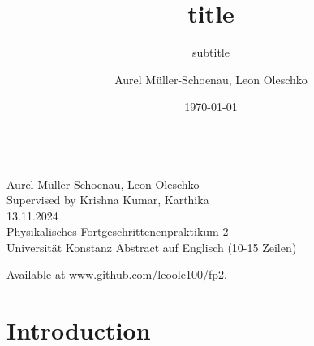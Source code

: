 \documentclass[
    parskip=half, 
    twoside=false,
    twocolumn=true,
    fontsize=11pt,
]{scrarticle}
\begin{document}
\title{title}
\subtitle{subtitle}
\author{Aurel Müller-Schoenau, Leon Oleschko}
\date{\dotdate\today}


\begin{titlepage}
    \sffamily
    \vspace*{3cm}
    {
        \fontsize{32}{32}
    }
    \vspace{.25cm}\\
    {
        \Large
        Aurel Müller-Schoenau, Leon Oleschko\\
        Supervised by Krishna Kumar, Karthika
        \vspace{.05cm}\\
        13.11.2024
        \vspace{.25cm}\\
        \normalsize
        Physikalisches Fortgeschrittenenpraktikum 2\\
        Universität Konstanz
    }
    \vfill
    {
        \normalfont\normalsize
        Abstract auf Englisch (10-15 Zeilen)
        \blindtext[2]
    }
    \vfill
    \begin{flushright}
        Available at \url{www.github.com/leoole100/fp2}.
    \end{flushright}
\end{titlepage}

\section{Introduction}


\end{document}
